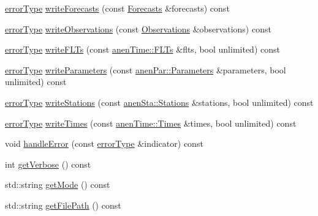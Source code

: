 \begin{DoxyCompactItemize}
\item 
\mbox{\hyperlink{class_an_en_i_o_aa56bc1ec6610b86db4349bce20f9ead0}{error\+Type}} \mbox{\hyperlink{class_an_en_i_o_abc5b12bc4692f3ac303fa5430aecaf4c}{write\+Forecasts}} (const \mbox{\hyperlink{class_forecasts}{Forecasts}} \&forecasts) const
\item 
\mbox{\hyperlink{class_an_en_i_o_aa56bc1ec6610b86db4349bce20f9ead0}{error\+Type}} \mbox{\hyperlink{class_an_en_i_o_ae89350e02d93439e79aa76068062490a}{write\+Observations}} (const \mbox{\hyperlink{class_observations}{Observations}} \&observations) const
\item 
\mbox{\hyperlink{class_an_en_i_o_aa56bc1ec6610b86db4349bce20f9ead0}{error\+Type}} \mbox{\hyperlink{class_an_en_i_o_a150e3fc6fe249b11bac909e5ee843a58}{write\+F\+L\+Ts}} (const \mbox{\hyperlink{classanen_time_1_1_f_l_ts}{anen\+Time\+::\+F\+L\+Ts}} \&flts, bool unlimited) const
\item 
\mbox{\hyperlink{class_an_en_i_o_aa56bc1ec6610b86db4349bce20f9ead0}{error\+Type}} \mbox{\hyperlink{class_an_en_i_o_a9ae88d089b2de16571085cb6f7f4cefb}{write\+Parameters}} (const \mbox{\hyperlink{classanen_par_1_1_parameters}{anen\+Par\+::\+Parameters}} \&parameters, bool unlimited) const
\item 
\mbox{\hyperlink{class_an_en_i_o_aa56bc1ec6610b86db4349bce20f9ead0}{error\+Type}} \mbox{\hyperlink{class_an_en_i_o_ac4cb6e66c0661eff0a10dcc3cb3324e8}{write\+Stations}} (const \mbox{\hyperlink{classanen_sta_1_1_stations}{anen\+Sta\+::\+Stations}} \&stations, bool unlimited) const
\item 
\mbox{\hyperlink{class_an_en_i_o_aa56bc1ec6610b86db4349bce20f9ead0}{error\+Type}} \mbox{\hyperlink{class_an_en_i_o_a13ba268b1cae107c145ad8ed895ddedd}{write\+Times}} (const \mbox{\hyperlink{classanen_time_1_1_times}{anen\+Time\+::\+Times}} \&times, bool unlimited) const
\item 
void \mbox{\hyperlink{class_an_en_i_o_a92276aeba9c0b5bd1cd3d285271d505f}{handle\+Error}} (const \mbox{\hyperlink{class_an_en_i_o_aa56bc1ec6610b86db4349bce20f9ead0}{error\+Type}} \&indicator) const
\item 
int \mbox{\hyperlink{class_an_en_i_o_a0bf0dab5e393c5597f97ab38c910e24d}{get\+Verbose}} () const
\item 
std\+::string \mbox{\hyperlink{class_an_en_i_o_a85d6f6dbf12ba5250ebc93065b7cb50c}{get\+Mode}} () const
\item 
std\+::string \mbox{\hyperlink{class_an_en_i_o_aae00624f6127c7946496443f5322ec8e}{get\+File\+Path}} () const
\item 

\end{DoxyCompactItemize}
